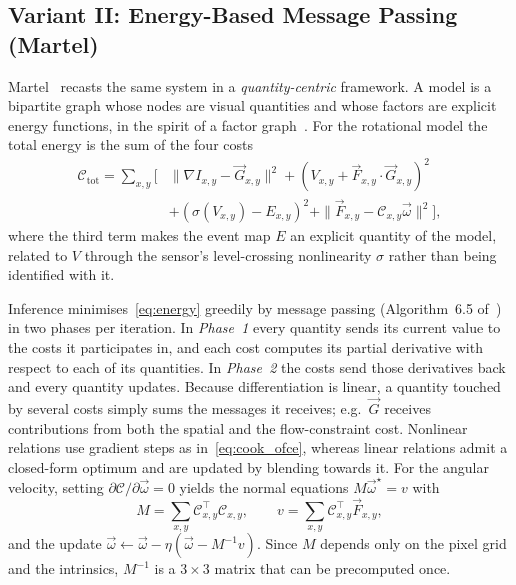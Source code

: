 \documentclass[journal]{IEEEtran}
\newcommand{\Imap}{I}
\newcommand{\Vmap}{V}
\newcommand{\Gmap}{\vec{G}}
\newcommand{\Fmap}{\vec{F}}
\newcommand{\Cmat}{\mathcal{C}}
\newcommand{\wvec}{\vec{\omega}}
\begin{document}
\subsection{Variant II: Energy-Based Message Passing (Martel)}
\label{sec:martel}

Martel~\cite{martel2019thesis} recasts the same system in a
\emph{quantity-centric} framework. A model is a bipartite graph whose nodes are
visual quantities and whose factors are explicit energy functions, in the spirit
of a factor graph~\cite{kschischang2001}. For the rotational model the total energy is
the sum of the four costs
\begin{align}
\mathcal{C}_{\text{tot}} = \sum_{x,y} \Big[ &
  \|\nabla \Imap_{x,y}-\Gmap_{x,y}\|^2
+ (\Vmap_{x,y}+\Fmap_{x,y}\cdot\Gmap_{x,y})^2 \nonumber\\
&+ (\sigma(\Vmap_{x,y})-E_{x,y})^2
+ \|\Fmap_{x,y}-\Cmat_{x,y}\wvec\|^2 \Big],
\label{eq:energy}
\end{align}
where the third term makes the event map $E$ an explicit quantity of the model,
related to $\Vmap$ through the sensor's level-crossing nonlinearity $\sigma$
rather than being identified with it.

Inference minimises~\eqref{eq:energy} greedily by message passing
(Algorithm~6.5 of~\cite{martel2019thesis}) in two phases per iteration. In
\emph{Phase~1} every quantity sends its current value to the costs it
participates in, and each cost computes its partial derivative with respect to
each of its quantities. In \emph{Phase~2} the costs send those derivatives back
and every quantity updates. Because differentiation is linear, a quantity
touched by several costs simply sums the messages it receives; e.g.\ $\Gmap$
receives contributions from both the spatial and the flow-constraint cost.
Nonlinear relations use gradient steps as in~\eqref{eq:cook_ofce}, whereas linear
relations admit a closed-form optimum and are updated by blending towards it. For
the angular velocity, setting $\partial \mathcal{C}/\partial\wvec = 0$ yields the
normal equations $M\wvec^\star = v$ with
\begin{equation}
M=\sum_{x,y}\Cmat_{x,y}^{\!\top}\Cmat_{x,y}, \qquad
v=\sum_{x,y}\Cmat_{x,y}^{\!\top}\Fmap_{x,y},
\label{eq:normaleq}
\end{equation}
and the update $\wvec \leftarrow \wvec - \eta(\wvec - M^{-1}v)$. Since $M$
depends only on the pixel grid and the intrinsics, $M^{-1}$ is a $3\times3$
matrix that can be precomputed once.
\end{document}

